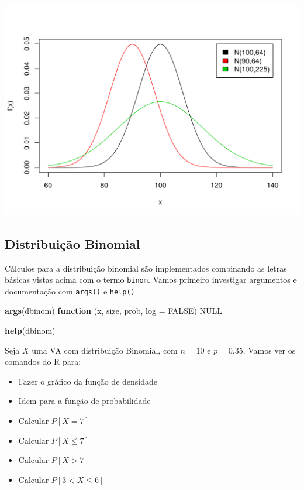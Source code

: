 \documentclass[10pt,a4paper]{book}
\newenvironment{Shaded}{\begin{snugshade}}{\end{snugshade}}
\newcommand{\KeywordTok}[1]{\textcolor[rgb]{0.13,0.29,0.53}{\textbf{#1}}}
\newcommand{\DataTypeTok}[1]{\textcolor[rgb]{0.13,0.29,0.53}{#1}}
\newcommand{\OtherTok}[1]{\textcolor[rgb]{0.56,0.35,0.01}{#1}}
\newcommand{\ControlFlowTok}[1]{\textcolor[rgb]{0.13,0.29,0.53}{\textbf{#1}}}
\newcommand{\NormalTok}[1]{#1}
\providecommand{\tightlist}{%
  \setlength{\itemsep}{0pt}\setlength{\parskip}{0pt}}
\begin{document}
\begin{center}\includegraphics{figures/unnamed-chunk-345-1} \end{center}

\subsection{Distribuição Binomial}\label{distribuicao-binomial}

Cálculos para a distribuição binomial são implementados combinando as
letras básicas vistas acima com o termo \texttt{binom}. Vamos primeiro
investigar argumentos e documentação com \texttt{args()} e
\texttt{help()}.

\begin{Shaded}
\begin{Highlighting}[]
\KeywordTok{args}\NormalTok{(dbinom)}
\ControlFlowTok{function}\NormalTok{ (x, size, prob, }\DataTypeTok{log =} \OtherTok{FALSE}\NormalTok{) }
\OtherTok{NULL}
\end{Highlighting}
\end{Shaded}

\begin{Shaded}
\begin{Highlighting}[]
\KeywordTok{help}\NormalTok{(dbinom)}
\end{Highlighting}
\end{Shaded}

Seja \(X\) uma VA com distribuição Binomial, com \(n=10\) e \(p=0.35\).
Vamos ver os comandos do R para:

\begin{itemize}
\tightlist
\item
  Fazer o gráfico da função de densidade
\item
  Idem para a função de probabilidade
\item
  Calcular \(P[X = 7]\)
\item
  Calcular \(P[X \leq 7]\)
\item
  Calcular \(P[X > 7]\)
\item
  Calcular \(P[3 < X \leq 6]\)
\end{itemize}
\end{document}
